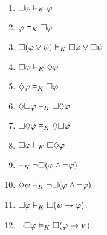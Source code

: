 \documentclass[a4paper, 11pt]{article}                  %
\begin{document}
\begin{enumerate}
	\item $\Box \metaA \MLmodels[K] \metaA$

	\item $\metaA \MLmodels[K] \Box \metaA$

	\item $\Box(\metaA \vee \metaB) \MLmodels[K] \Box \metaA \vee \Box \metaB$

	\item $\Box \metaA \MLmodels[K] \Diamond \metaA$

	\item $\Diamond \metaA \MLmodels[K] \Box \metaA$

	\item $\Diamond\Box \metaA \MLmodels[K] \Box\Diamond \metaA$

	\item $\Box\Diamond \metaA \MLmodels[K] \Diamond\Box \metaA$

	\item $\Box \metaA \MLmodels[K] \Box\Diamond \metaA$

	\item $\MLmodels[K] \neg\Box(\metaA \wedge \neg \metaA)$

	\item $\Diamond \metaB \MLmodels[K] \neg\Box(\metaA \wedge \neg \metaA)$

	\item $\Box \metaA \MLmodels[K] \Box(\metaB \rightarrow \metaA)$.

	\item $\neg\Box \metaA \MLmodels[K] \Box(\metaA \rightarrow \metaB)$.

\end{enumerate}
\end{document}
